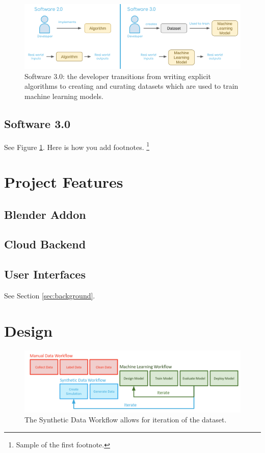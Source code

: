 \documentclass{article}
\begin{document}
\begin{figure}
	\centering
	\includegraphics[width=\textwidth]{software3.png}
	\caption{Software 3.0: the developer transitions from writing explicit algorithms to creating and curating datasets which are used to train machine learning models.}
	\label{fig:fig2}
\end{figure}

\subsection{Software 3.0}
See Figure \ref{fig:fig2}. Here is how you add footnotes. \footnote{Sample of the first footnote.}
\lipsum[2]

\section{Project Features}
\label{sec:projectfeatures}

\subsection{Blender Addon}
\lipsum[2]

\subsection{Cloud Backend}
\lipsum[2]

\subsection{User Interfaces}
\lipsum[4] See Section \ref{sec:background}.

\section{Design}
\label{sec:design}

\begin{figure}
	\centering
	\includegraphics[width=\textwidth]{workflow.png}
	\caption{The Synthetic Data Workflow allows for iteration of the dataset.}
	\label{fig:fig3}
\end{figure}
\end{document}
